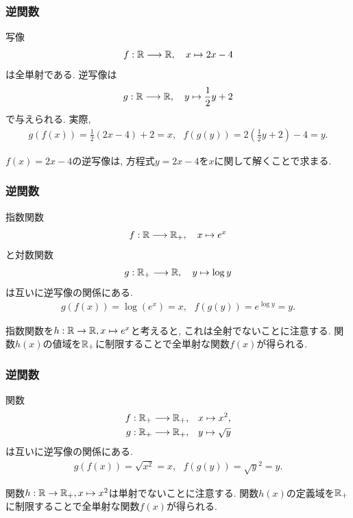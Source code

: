 \begin{frame}
\frametitle{逆関数}



\begin{Ex}
写像
$$
f:\mathbb{R} \longrightarrow \mathbb{R}, \ \ \ x \mapsto 2x-4
$$
は全単射である. 
逆写像は
$$
g:\mathbb{R} \longrightarrow \mathbb{R}, \ \ \ y \mapsto \frac{1}{2}y+2
$$
で与えられる. 
実際, 
\begin{align*}
g(f(x))=\frac{1}{2}(2x-4)+2=x, \ \ \ 
f(g(y))=2(\frac{1}{2}y+2)-4=y. 
\end{align*}
\end{Ex}
$f(x)=2x-4$の逆写像は, 方程式$y=2x-4$を$x$に関して解くことで求まる. 


\end{frame}





\begin{frame}
\frametitle{逆関数}



\begin{Ex}
指数関数
$$
f: \R \longrightarrow \R_+, \ \ \ x \mapsto e^x
$$
と対数関数
$$
g: \mathbb{R}_+ \longrightarrow \mathbb{R}, \ \ \ y \mapsto \log y
$$
は互いに逆写像の関係にある. 
\begin{align*}
g(f(x))=\log(e^x)=x, \ \ \ f(g(y))=e^{\log y}=y.
\end{align*}
\end{Ex}
指数関数を$h:\mathbb{R} \rightarrow \mathbb{R}, x \mapsto e^x$と考えると, これは全射でないことに注意する. 
関数$h(x)$の値域を$\mathbb{R}_+$に制限することで全単射な関数$f(x)$が得られる. 

\end{frame}




\begin{frame}
\frametitle{逆関数}



\begin{Ex}
関数
\begin{align*}
f: \mathbb{R}_+ \longrightarrow \mathbb{R}_+, & \ \ \ x \mapsto x^2, \\
g: \mathbb{R}_+ \longrightarrow \mathbb{R}_+, & \ \ \ y \mapsto \sqrt{y}
\end{align*}
は互いに逆写像の関係にある. 
\begin{align*}
g(f(x))=\sqrt{x^2}=x, \ \ \ f(g(y))=\sqrt{y}^2=y.
\end{align*}
\end{Ex}
関数$h:\mathbb{R} \rightarrow \mathbb{R}_+, x \mapsto x^2$は単射でないことに注意する. 
関数$h(x)$の定義域を$\mathbb{R}_+$に制限することで全単射な関数$f(x)$が得られる. 
\end{frame}




